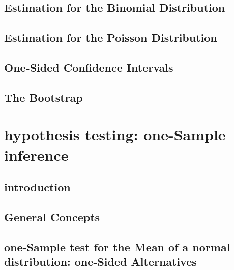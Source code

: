 \documentclass[12pt,]{article}
\begin{document}
\hypertarget{estimation-for-the-binomial-distribution}{%
\subsection{Estimation for the Binomial
Distribution}\label{estimation-for-the-binomial-distribution}}

\hypertarget{estimation-for-the-poisson-distribution}{%
\subsection{Estimation for the Poisson
Distribution}\label{estimation-for-the-poisson-distribution}}

\hypertarget{one-sided-confidence-intervals}{%
\subsection{One-Sided Confidence
Intervals}\label{one-sided-confidence-intervals}}

\hypertarget{the-bootstrap}{%
\subsection{The Bootstrap}\label{the-bootstrap}}

\hypertarget{hypothesis-testing-one-sample-inference}{%
\section{hypothesis testing: one-Sample
inference}\label{hypothesis-testing-one-sample-inference}}

\hypertarget{introduction-3}{%
\subsection{introduction}\label{introduction-3}}

\hypertarget{general-concepts-1}{%
\subsection{General Concepts}\label{general-concepts-1}}

\hypertarget{one-sample-test-for-the-mean-of-a-normal-distribution-one-sided-alternatives}{%
\subsection{one-Sample test for the Mean of a normal distribution:
one-Sided
Alternatives}\label{one-sample-test-for-the-mean-of-a-normal-distribution-one-sided-alternatives}}
\end{document}
